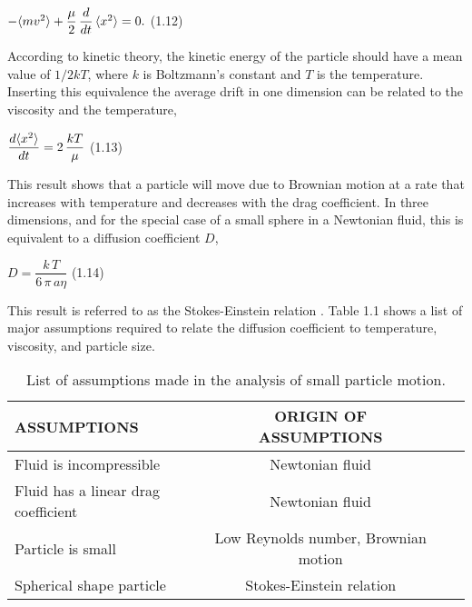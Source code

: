 \vspace{7mm}
\hspace{52mm} $-\langle{mv^2}\rangle + \dfrac{\mu}{2}\,\dfrac{d}{dt}\,\langle{x^2}\rangle = 0.\notag$ \hspace*{0pt}\hfill (1.12) 
\vspace{7mm}


According to kinetic theory, the kinetic energy of the particle should have a mean value of $1/2 kT$, where $k$ is Boltzmann’s constant and $T$ is the temperature.  Inserting this equivalence the average drift in one dimension can be related to the viscosity and the temperature, 

\vspace{7mm}
\hspace{60mm} $\dfrac {d\langle{x^2}\rangle}{dt} = 2\, \dfrac {kT}{\mu}\notag$ \hspace*{0pt}\hfill (1.13) 
\vspace{7mm}

This result shows that a particle will move due to Brownian motion at a rate that increases with temperature and decreases with the drag coefficient. In three dimensions, and for the special case of a small sphere in a Newtonian fluid, this is equivalent to a diffusion coefficient $D$, 

\vspace{7mm}
\hspace{60mm} $D = \dfrac{k\, T}{6\, \pi \, a \eta}$ \hspace*{0pt}\hfill (1.14) 
\vspace{7mm}

This result is referred to as the Stokes-Einstein relation \citep{Feynman}.  Table 1.1 shows a list of major assumptions required to relate the diffusion coefficient to temperature, viscosity, and particle size.  


\begin{table}
\begin{center}
\begin{tabular}{|l|c|c|c|}
\hline
{\sc \textbf{ASSUMPTIONS}}  &  {\sc \textbf{ORIGIN OF ASSUMPTIONS}} \\
\hline
Fluid is incompressible & Newtonian fluid \\
\hline
Fluid has a linear drag coefficient  & Newtonian fluid \\
\hline
Particle is small & Low Reynolds number, Brownian motion\\
\hline
Spherical shape particle & Stokes-Einstein relation \\
\hline
\end{tabular}
\end{center}
\caption{List of assumptions made in the analysis of small particle motion.}
\label{table_genomes}
\end{table}

